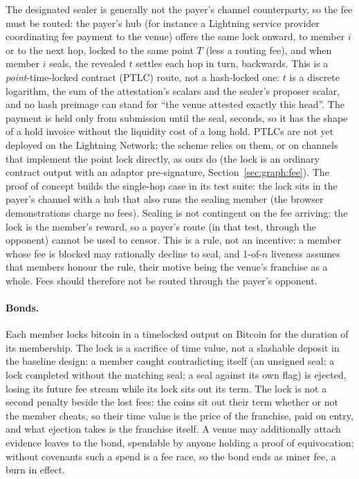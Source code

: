 \documentclass[11pt]{article}
\begin{document}
The designated sealer is generally not the payer's channel counterparty,
so the fee must be routed: the payer's hub (for instance a Lightning
service provider coordinating fee payment to the venue) offers the same lock onward,
to member $i$ or to the next hop, locked to the same point $T$ (less a
routing fee), and when member $i$ seals, the revealed $t$ settles each
hop in turn, backwards. This is a \emph{point}-time-locked contract
(PTLC) route, not a hash-locked one: $t$ is a discrete logarithm, the
sum of the attestation's scalars and the sealer's proposer scalar, and
no hash preimage can stand for ``the venue attested exactly this head''.
The payment is held only from submission until the seal, seconds, so it
has the shape of a hold invoice without the liquidity cost of a long
hold. PTLCs are not yet deployed on the Lightning Network; the scheme
relies on them, or on channels that implement the point lock directly,
as ours do (the lock is an ordinary contract output with an adaptor
pre-signature, Section~\ref{sec:graph:fee}). The proof of concept
builds the single-hop case in its test suite: the lock sits in the
payer's channel with a hub that also runs the sealing member (the
browser demonstrations charge no fees). Sealing is not contingent on
the fee arriving: the lock is the member's reward, so a payer's route
(in that test, through the opponent) cannot be used to censor. This is a rule, not an incentive: a
member whose fee is blocked may rationally decline to seal, and
1-of-$n$ liveness assumes that members honour the rule, their motive
being the venue's franchise as a whole. Fees should therefore not be
routed through the payer's opponent.

\paragraph{Bonds.} Each member locks bitcoin in a timelocked output on
Bitcoin for the duration of its membership. The lock is a sacrifice of
time value, not a slashable deposit in the baseline design: a member
caught contradicting itself (an unsigned seal; a lock completed
without the matching seal; a seal against its own flag) is
ejected, losing its future fee stream while its lock sits out its term.
The lock is not a second penalty beside the lost fees: the coins sit
out their term whether or not the member cheats, so their time value is
the price of the franchise, paid on entry, and what ejection takes is
the franchise itself.
A venue may additionally attach evidence leaves to the bond, spendable
by anyone holding a proof of equivocation; without covenants such a
spend is a fee race, so the bond ends as miner fee, a burn in effect.
\end{document}

